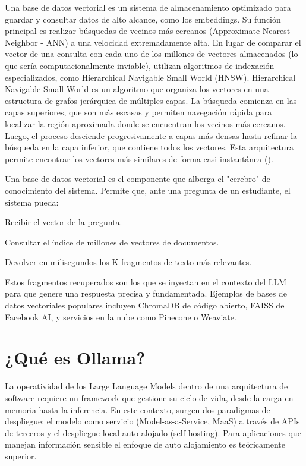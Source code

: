 {{Una base de datos vectorial es un sistema de almacenamiento optimizado para guardar y consultar datos de alto alcance, como los embeddings. Su función principal es realizar búsquedas de vecinos más cercanos (Approximate Nearest Neighbor - ANN) a una velocidad extremadamente alta. En lugar de comparar el vector de una consulta con cada uno de los millones de vectores almacenados (lo que sería computacionalmente inviable), utilizan algoritmos de indexación especializados, como Hierarchical Navigable Small World (HNSW). Hierarchical Navigable Small World es un algoritmo que organiza los vectores en una estructura de grafos jerárquica de múltiples capas. La búsqueda comienza en las capas superiores, que son más escasas y permiten navegación rápida para localizar la región aproximada donde se encuentran los vecinos más cercanos. Luego, el proceso desciende progresivamente a capas más densas hasta refinar la búsqueda en la capa inferior, que contiene todos los vectores. Esta arquitectura permite encontrar los vectores más similares de forma casi instantánea (\cite{malkov2016efficient}). 

Una base de datos vectorial es el componente que alberga el "cerebro" de conocimiento del sistema. Permite que, ante una pregunta de un estudiante, el sistema pueda:

\begin{listaenumerada}
    \item Recibir el vector de la pregunta.
    \item Consultar el índice de millones de vectores de documentos.
    \item Devolver en milisegundos los K fragmentos de texto más relevantes.
\end{listaenumerada}

Estos fragmentos recuperados son los que se inyectan en el contexto del LLM para que genere una respuesta precisa y fundamentada. Ejemplos de bases de datos vectoriales populares incluyen ChromaDB de código abierto, FAISS de Facebook AI, y servicios en la nube como Pinecone o Weaviate.

\section{¿Qué es Ollama?}
La operatividad de los Large Language Models dentro de una arquitectura de software requiere un framework que gestione su ciclo de vida, desde la carga en memoria hasta la inferencia. En este contexto, surgen dos paradigmas de despliegue: el modelo como servicio (Model-as-a-Service, MaaS) a través de APIs de terceros y el despliegue local auto alojado (self-hosting). Para aplicaciones que manejan información sensible el enfoque de auto alojamiento es teóricamente superior.

}}

